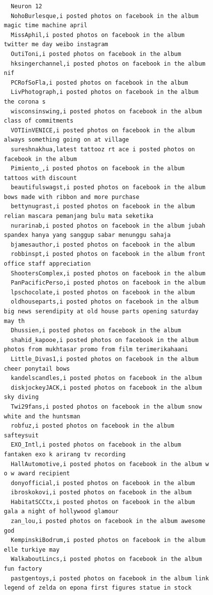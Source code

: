 \begin{figure}[htpb]
\begin{verbatim}
  Neuron 12
  NohoBurlesque,i posted photos on facebook in the album magic time machine april
  MissAphil,i posted photos on facebook in the album twitter me day weibo instagram
  OutiToni,i posted photos on facebook in the album
  hksingerchannel,i posted photos on facebook in the album nif
  PCRofSoFla,i posted photos on facebook in the album
  LivPhotograph,i posted photos on facebook in the album the corona s
  wisconsinswing,i posted photos on facebook in the album class of commitments
  VOTIinVENICE,i posted photos on facebook in the album always something going on at village
  sureshnakhua,latest tattooz rt ace i posted photos on facebook in the album
  Pimiento_,i posted photos on facebook in the album tattoos with discount
  beautifulswagst,i posted photos on facebook in the album bows made with ribbon and more purchase
  bettynugrast,i posted photos on facebook in the album relian mascara pemanjang bulu mata seketika
  nurarinab,i posted photos on facebook in the album jubah spandex hanya yang sanggup sabar menunggu sahaja
  bjamesauthor,i posted photos on facebook in the album
  robbinspt,i posted photos on facebook in the album front office staff appreciation
  ShootersComplex,i posted photos on facebook in the album
  PanPacificPerso,i posted photos on facebook in the album
  lpschocolate,i posted photos on facebook in the album
  oldhouseparts,i posted photos on facebook in the album big news serendipity at old house parts opening saturday may th
  Dhussien,i posted photos on facebook in the album
  shahid_kapooe,i posted photos on facebook in the album photos from mukhtasar promo from film terimerikahaani
  Little_Divas1,i posted photos on facebook in the album cheer ponytail bows
  kandelscandles,i posted photos on facebook in the album
  diskjockeyJACK,i posted photos on facebook in the album sky diving
  Twi29fans,i posted photos on facebook in the album snow white and the huntsman
  robfuz,i posted photos on facebook in the album safteysuit
  EXO_Intl,i posted photos on facebook in the album fantaken exo k arirang tv recording
  HallAutomotive,i posted photos on facebook in the album w o w award recipient
  donyofficial,i posted photos on facebook in the album
  ibroskokovi,i posted photos on facebook in the album
  HabitatSCCtx,i posted photos on facebook in the album gala a night of hollywood glamour
  zan_lou,i posted photos on facebook in the album awesome god
  KempinskiBodrum,i posted photos on facebook in the album elle turkiye may
  WalkaboutLincs,i posted photos on facebook in the album fun factory
  pastgentoys,i posted photos on facebook in the album link legend of zelda on epona first figures statue in stock

\end{verbatim}
\end{figure}
